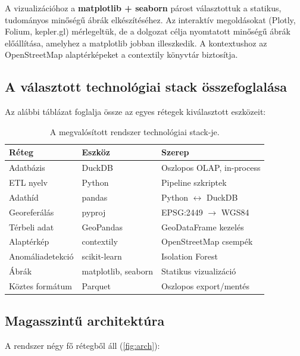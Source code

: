 A vizualizációhoz a \textbf{matplotlib + seaborn} párost választottuk a statikus, tudományos minőségű ábrák elkészítéséhez. Az interaktív megoldásokat (Plotly, Folium, kepler.gl) mérlegeltük, de a dolgozat célja nyomtatott minőségű ábrák előállítása, amelyhez a matplotlib jobban illeszkedik. A kontextushoz az OpenStreetMap alaptérképeket a contextily könyvtár biztosítja.

\subsection{A választott technológiai stack összefoglalása}

Az alábbi táblázat foglalja össze az egyes rétegek kiválasztott eszközeit:

\begin{table}[H]
\centering
\caption{A megvalósított rendszer technológiai stack-je.}
\label{tab:tech_stack}
\begin{tabular}{l l l}
\hline
\textbf{Réteg} & \textbf{Eszköz} & \textbf{Szerep} \\
\hline
Adatbázis       & DuckDB            & Oszlopos OLAP, in-process \\
ETL nyelv       & Python            & Pipeline szkriptek \\
Adathíd         & pandas            & Python $\leftrightarrow$ DuckDB \\
Georeferálás    & pyproj            & EPSG:2449 $\rightarrow$ WGS84 \\
Térbeli adat    & GeoPandas         & GeoDataFrame kezelés \\
Alaptérkép      & contextily        & OpenStreetMap csempék \\
Anomáliadetekció & scikit-learn     & Isolation Forest \\
Ábrák           & matplotlib, seaborn & Statikus vizualizáció \\
Köztes formátum & Parquet           & Oszlopos export/mentés \\
\hline
\end{tabular}
\end{table}


\subsection{Magasszintű architektúra}

A rendszer négy fő rétegből áll (\autoref{fig:arch}):

